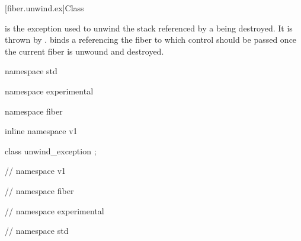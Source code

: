 [fiber.unwind.ex]{Class }

 is the exception used to unwind the stack referenced by
a \fiber being destroyed.
It is thrown by \unwindfib. \unwindex binds a \fiber referencing the fiber to
which control should be passed once the current fiber is unwound and destroyed.

\begin{codeblock}
namespace std {
namespace experimental {
namespace fiber {
inline namespace v1 {

class unwind_exception {
};

} // namespace v1
} // namespace fiber
} // namespace experimental
} // namespace std
\end{codeblock}
